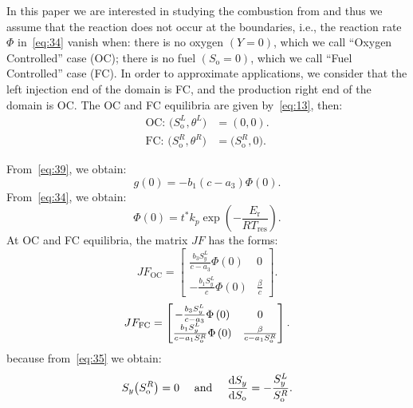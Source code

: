 \documentclass[
    8pt,
    aspectratio=1610,
    c,
    intlimits,
    leqno,
    professionalfonts,
]{beamer}
\begin{document}
\begin{frame}
	In this paper we are interested in studying the combustion from and
	thus we assume that the reaction does not occur at the boundaries,
	i.e., the reaction rate $\Phi$ in~\eqref{eq:34} vanish when: there
	is no oxygen $(Y=0)$, which we call ``Oxygen Controlled'' case
	(OC); there is no fuel $(S_{\text{o}}=0)$, which we call
	``Fuel Controlled'' case (FC).
	In order to approximate applications, we consider that the left
	injection end of the domain is FC, and the production right end of
	the domain is OC.
	The OC and FC equilibria are given by~\eqref{eq:13}, then:
	\begin{align*}
		\text{OC: }
		\big(S^{L}_{\text{o}},\theta^{L}\big) & =
		\left(0,0\right).                         \\
		\text{FC: }
		\big(S^{R}_{\text{o}},\theta^{R}\big) & =
		\big(S^{R}_{\text{o}},0\big).
	\end{align*}

	From~\eqref{eq:39}, we obtain:
	\setcounter{equation}{47}
	\begin{equation}
		g\left(0\right)=
		-b_{1}\left(c-a_{3}\right)\Phi\left(0\right).
	\end{equation}
	From~\eqref{eq:34}, we obtain:
	\begin{equation}
		\Phi\left(0\right)=
		t^{\ast}
		k_{p}
		\exp\left(-\frac{E_{\text{r}}}{RT_{\text{res}}}\right).
	\end{equation}
	At OC and FC equilibria, the matrix $JF$ has the forms:
	\begin{equation}\label{eq:50}
		JF_{\text{OC}}=
		\begin{bmatrix}
			\frac{b_{3}S^{L}_{y}}{c-a_{3}}\Phi\left(0\right) & 0               \\
			-\frac{b_{1}S^{L}_{y}}{c}\Phi\left(0\right)      & \frac{\beta}{c}
		\end{bmatrix}.
	\end{equation}
	\begin{equation}\label{eq:51}
		JF_{\text{FC}}=
		\begin{bmatrix}
			-\frac{b_{3}S^{L}_{y}}{c-a_{3}}\Phi\left(0\right)                & 0                                     \\[.5\baselineskip]
			\frac{b_{1}S^{L}_{y}}{c-a_{1}S^{R}_{\text{o}}}\Phi\left(0\right) & \frac{\beta}{c-a_{1}S^{R}_{\text{o}}}
		\end{bmatrix}.
	\end{equation}
	because from~\eqref{eq:35} we obtain:
	\begin{equation*}
		S_{y}
		\big(S^{R}_{\text{o}}\big)=0
		\quad\text{ and }\quad
		\diff{S_{y}}{S_{\text{o}}}=
		-\frac{S^{L}_{y}}{S^{R}_{\text{o}}}.
	\end{equation*}
\end{frame}
\end{document}
